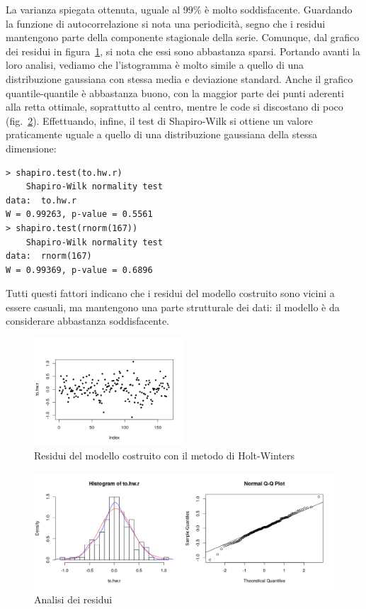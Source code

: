 \documentclass[11pt,a4paper,oneside]{article}
\begin{document}
La varianza spiegata ottenuta, uguale al 99\% è molto soddisfacente. Guardando la funzione di autocorrelazione si nota una periodicità, segno che i residui mantengono parte della componente stagionale della serie.
Comunque, dal grafico dei residui in figura~\ref{fig:hwResid}, si nota che essi sono abbastanza sparsi. 
Portando avanti la loro analisi, vediamo che l'istogramma è molto simile a quello di una distribuzione gaussiana con stessa media e deviazione standard. Anche il grafico quantile-quantile è abbastanza buono, con la maggior parte dei punti aderenti alla retta ottimale, soprattutto al centro, mentre le code si discostano di poco (fig.~\ref{fig:residAnalysis}). Effettuando, infine, il test di Shapiro-Wilk si ottiene un valore praticamente uguale a quello di una distribuzione gaussiana della stessa dimensione:
\begin{verbatim}
> shapiro.test(to.hw.r)
	Shapiro-Wilk normality test
data:  to.hw.r
W = 0.99263, p-value = 0.5561
> shapiro.test(rnorm(167))
	Shapiro-Wilk normality test
data:  rnorm(167)
W = 0.99369, p-value = 0.6896
\end{verbatim}
Tutti questi fattori indicano che i residui del modello costruito sono vicini a essere casuali, ma mantengono una parte strutturale dei dati: il modello è da considerare abbastanza soddisfacente.
\begin{figure}[h]
\centering
\includegraphics[width=0.5\textwidth]{images/hwResid}
\caption{Residui del modello costruito con il metodo di Holt-Winters}
\label{fig:hwResid}
\end{figure}
\begin{figure}[h]
\centering
\includegraphics[width=1\textwidth]{images/residAnalysis}
\caption{Analisi dei residui}
\label{fig:residAnalysis}
\end{figure}
\end{document}
